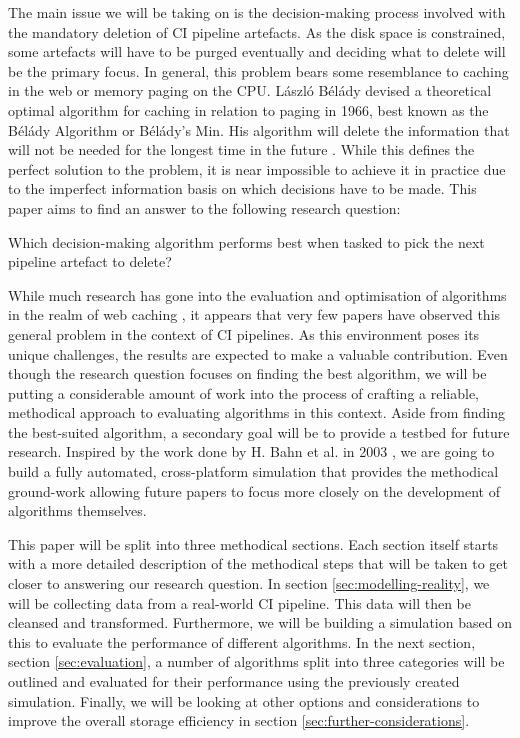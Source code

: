     The main issue we will be taking on is the decision-making process involved with the mandatory deletion of CI pipeline artefacts. As the disk space is constrained, some artefacts will have to be purged eventually and deciding what to delete will be the primary focus. In general, this problem bears some resemblance to caching in the web or memory paging on the CPU. László Bélády devised a theoretical optimal algorithm for caching in relation to paging in 1966, best known as the Bélády Algorithm or Bélády's Min. His algorithm will delete the information that will not be needed for the longest time in the future \cite{belady-algo}. While this defines the perfect solution to the problem, it is near impossible to achieve it in practice due to the imperfect information basis on which decisions have to be made. This paper aims to find an answer to the following research question:
    
    \begin{displayquote}
        Which decision-making algorithm performs best when tasked to pick the next pipeline artefact to delete?
    \end{displayquote}
    
    While much research has gone into the evaluation and optimisation of algorithms in the realm of web caching \cite{web-caching-simulation}, it appears that very few papers have observed this general problem in the context of CI pipelines. As this environment poses its unique challenges, the results are expected to make a valuable contribution. Even though the research question focuses on finding the best algorithm, we will be putting a considerable amount of work into the process of crafting a reliable, methodical approach to evaluating algorithms in this context. Aside from finding the best-suited algorithm, a secondary goal will be to provide a testbed for future research. Inspired by the work done by H. Bahn et al. in 2003 \cite{web-caching-simulation}, we are going to build a fully automated, cross-platform simulation that provides the methodical ground-work allowing future papers to focus more closely on the development of algorithms themselves.

    This paper will be split into three methodical sections. Each section itself starts with a more detailed description of the methodical steps that will be taken to get closer to answering our research question. In section \ref{sec:modelling-reality}, we will be collecting data from a real-world CI pipeline. This data will then be cleansed and transformed. Furthermore, we will be building a simulation based on this to evaluate the performance of different algorithms. In the next section, section \ref{sec:evaluation}, a number of algorithms split into three categories will be outlined and evaluated for their performance using the previously created simulation. Finally, we will be looking at other options and considerations to improve the overall storage efficiency in section \ref{sec:further-considerations}.
